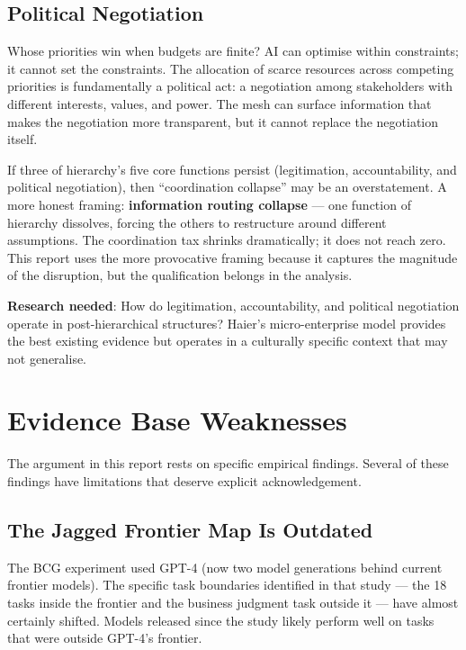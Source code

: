 \subsection{Political Negotiation}

Whose priorities win when budgets are finite? AI can optimise within constraints; it cannot set the constraints. The allocation of scarce resources across competing priorities is fundamentally a political act: a negotiation among stakeholders with different interests, values, and power. The mesh can surface information that makes the negotiation more transparent, but it cannot replace the negotiation itself.

\begin{cautionbox}[title={An Honest Reframing}]
If three of hierarchy's five core functions persist (legitimation, accountability, and political negotiation), then ``coordination collapse'' may be an overstatement. A more honest framing: \textbf{information routing collapse} --- one function of hierarchy dissolves, forcing the others to restructure around different assumptions. The coordination tax shrinks dramatically; it does not reach zero. This report uses the more provocative framing because it captures the magnitude of the disruption, but the qualification belongs in the analysis.
\end{cautionbox}

\textbf{Research needed}: How do legitimation, accountability, and political negotiation operate in post-hierarchical structures? Haier's micro-enterprise model provides the best existing evidence but operates in a culturally specific context that may not generalise.

\section{Evidence Base Weaknesses}

The argument in this report rests on specific empirical findings. Several of these findings have limitations that deserve explicit acknowledgement.

\subsection{The Jagged Frontier Map Is Outdated}

The BCG experiment \parencite{DellAcqua2026} used GPT-4 (now two model generations behind current frontier models). The specific task boundaries identified in that study --- the 18 tasks inside the frontier and the business judgment task outside it --- have almost certainly shifted. Models released since the study likely perform well on tasks that were outside GPT-4's frontier.

